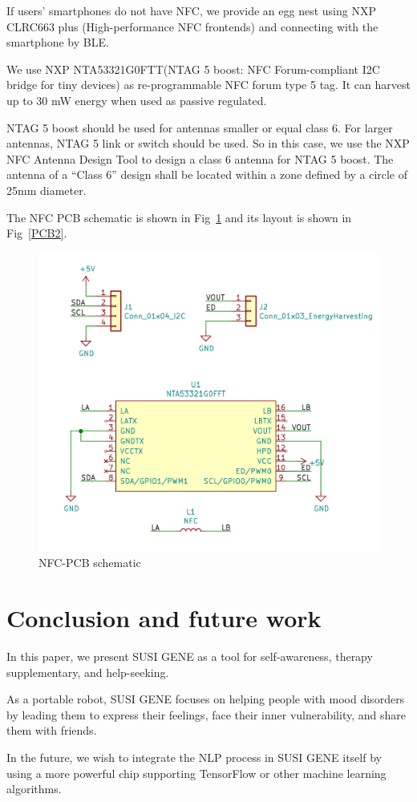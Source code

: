 \documentclass[manuscript,screen]{acmart}
\begin{document}
If users' smartphones do not have NFC, we provide an egg nest using NXP CLRC663 plus (High-performance NFC frontends) and connecting with the smartphone by BLE.

We use NXP NTA53321G0FTT(NTAG 5 boost: NFC Forum-compliant I2C bridge for tiny devices) as re-programmable NFC forum type 5 tag. It can harvest up to 30 mW energy when used as passive regulated.

NTAG 5 boost should be used for antennas smaller or equal class 6. For larger antennas, NTAG 5 link or switch should be used. So in this case, we use the NXP NFC Antenna Design Tool to design a class 6 antenna for NTAG 5 boost. The antenna of a “Class 6” design shall be located within a zone defined by a circle of 25mm diameter.

The NFC PCB schematic is shown in Fig~\ref{PCBsch2} and its layout is shown in Fig~\ref{PCB2}.

\begin{figure}[h]
  \centering
  \includegraphics[width=0.5\linewidth]{PCBsch2.png}
  \caption{NFC-PCB schematic}
  \label{PCBsch2}
\end{figure}

\section{Conclusion and future work}

In this paper, we present SUSI GENE as a tool for self-awareness, therapy supplementary, and help-seeking.

As a portable robot, SUSI GENE focuses on helping people with mood disorders by leading them to express their feelings, face their inner vulnerability, and share them with friends. 

In the future, we wish to integrate the NLP process in SUSI GENE itself by using a more powerful chip supporting TensorFlow or other machine learning algorithms. 
\end{document}
